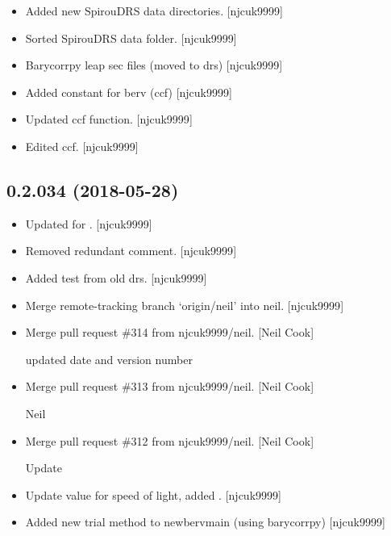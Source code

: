 \documentclass[a4paper,10pt,english]{report}
\begin{document}
\begin{itemize}
\item {} 
Added new SpirouDRS data directories. {[}njcuk9999{]}

\item {} 
Sorted SpirouDRS data folder. {[}njcuk9999{]}

\item {} 
Barycorrpy leap sec files (moved to drs) {[}njcuk9999{]}

\item {} 
Added constant for berv (ccf) {[}njcuk9999{]}

\item {} 
Updated ccf function. {[}njcuk9999{]}

\item {} 
Edited ccf. {[}njcuk9999{]}

\end{itemize}


\subsection{0.2.034 (2018-05-28)}
\label{\detokenize{misc/changelog:id428}}\begin{itemize}
\item {} 
Updated for . {[}njcuk9999{]}

\item {} 
Removed redundant comment. {[}njcuk9999{]}

\item {} 
Added test from old drs. {[}njcuk9999{]}

\item {} 
Merge remote-tracking branch ‘origin/neil’ into neil. {[}njcuk9999{]}

\item {} 
Merge pull request \#314 from njcuk9999/neil. {[}Neil Cook{]}

updated date and version number

\item {} 
Merge pull request \#313 from njcuk9999/neil. {[}Neil Cook{]}

Neil

\item {} 
Merge pull request \#312 from njcuk9999/neil. {[}Neil Cook{]}

Update 

\item {} 
Update value for speed of light, added .
{[}njcuk9999{]}

\item {} 
Added new trial method to newbervmain (using barycorrpy) {[}njcuk9999{]}

\end{itemize}
\end{document}
